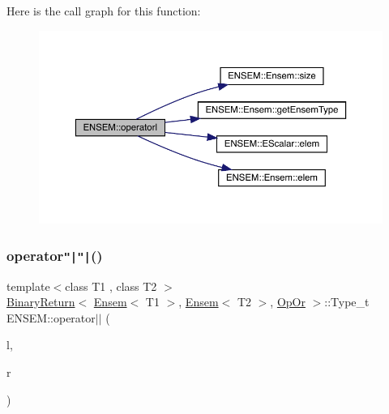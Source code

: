 Here is the call graph for this function\+:\nopagebreak
\begin{figure}[H]
\begin{center}
\leavevmode
\includegraphics[width=350pt]{d1/d9e/group__eensem_gacc25f74aa29769c6afffde4164c7821c_cgraph}
\end{center}
\end{figure}
\mbox{\label{group__eensem_ga5e2d1d875f2929ebe89f76b2d73b0a34}} 
\subsubsection{\texorpdfstring{operator\texttt{"|}\texttt{"|}()}{operator||()}\hspace{0.1cm}{\footnotesize\ttfamily [1/3]}}
{\footnotesize\ttfamily template$<$class T1 , class T2 $>$ \\
\mbox{\hyperlink{structENSEM_1_1BinaryReturn}{Binary\+Return}}$<$ \mbox{\hyperlink{classENSEM_1_1Ensem}{Ensem}}$<$ T1 $>$, \mbox{\hyperlink{classENSEM_1_1Ensem}{Ensem}}$<$ T2 $>$, \mbox{\hyperlink{structENSEM_1_1OpOr}{Op\+Or}} $>$\+::Type\+\_\+t E\+N\+S\+E\+M\+::operator$\vert$$\vert$ (\begin{DoxyParamCaption}\item[{const \mbox{\hyperlink{classENSEM_1_1Ensem}{Ensem}}$<$ T1 $>$ \&}]{l,  }\item[{const \mbox{\hyperlink{classENSEM_1_1Ensem}{Ensem}}$<$ T2 $>$ \&}]{r }\end{DoxyParamCaption})\hspace{0.3cm}{\ttfamily [inline]}}

